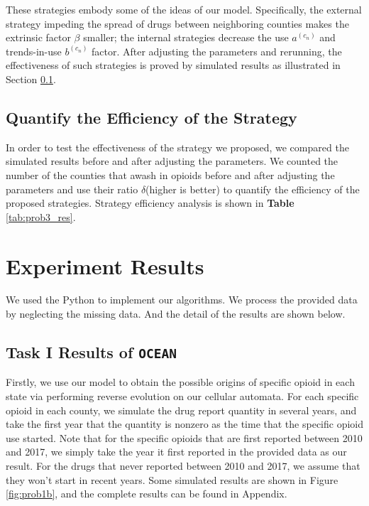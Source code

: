 \documentclass[a4paper]{article}
\begin{document}
These strategies embody some of the ideas of our model. Specifically, the external strategy impeding the spread of drugs between neighboring counties makes the extrinsic factor $\beta$ smaller; the internal strategies decrease the use $a^{(c_n)}$ and trends-in-use $b^{(c_n)}$ factor. After adjusting the parameters and rerunning, the effectiveness of such strategies is proved by simulated results as illustrated in Section \ref{section 5.2}.


\subsection{Quantify the Efficiency of the Strategy} \label{section 5.2}
In order to test the effectiveness of the strategy we proposed, we compared the simulated results before and after adjusting the parameters. We counted the number of the counties that awash in opioids before and after adjusting the parameters and use their ratio $\delta$(higher is better) to quantify the efficiency of the proposed strategies. Strategy efficiency analysis is shown in \textbf{Table} \ref{tab:prob3_res}.


\vspace{8pt}
\section{Experiment Results}{

We used the Python to implement our algorithms. We process the provided data by neglecting the missing data. And the detail of the results are shown below.
}

\subsection{\textbf{Task I} Results of \texttt{OCEAN}}
Firstly, we use our model to obtain the possible origins of specific opioid in each state via performing reverse evolution on our cellular automata. For each specific opioid in each county, we simulate the drug report quantity in several years, and take the first year that the quantity is nonzero as the time that the specific opioid use started. Note that for the specific opioids that are first reported between 2010 and 2017, we simply take the year it first reported in the provided data as our result. For the drugs that never reported between 2010 and 2017, we assume that they won't start in recent years. Some simulated results are shown in Figure \ref{fig:prob1b}, and the complete results can be found in Appendix.\\
\end{document}
